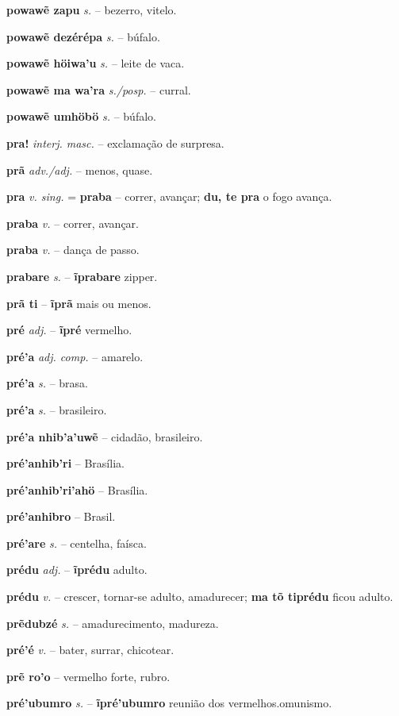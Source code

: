 \textbf{powawẽ zapu} \textit{s.} -- bezerro, vitelo.

\textbf{powawẽ dezérépa} \textit{s.} -- búfalo.

\textbf{powawẽ höiwa'u} \textit{s.} -- leite de vaca.

\textbf{powawẽ ma wa'ra} \textit{s./posp.} -- curral.

\textbf{powawẽ umhöbö} \textit{s.} -- búfalo.

\textbf{pra!} \textit{interj. masc.} -- exclamação de surpresa.

\textbf{prã} \textit{adv./adj.} -- menos, quase.

\textbf{pra} \textit{v. sing.} = \textbf{praba} -- correr, avançar; \textbf{du, te pra} o fogo avança.

\textbf{praba} \textit{v.} -- correr, avançar.

\textbf{praba} \textit{v.} -- dança de passo.

\textbf{prabare} \textit{s.} -- \textbf{ĩprabare} zipper.

\textbf{prã ti} -- \textbf{ĩprã} mais ou menos.

\textbf{pré} \textit{adj.} -- \textbf{ĩpré} vermelho.

\textbf{pré'a} \textit{adj. comp.} -- amarelo.

\textbf{pré'a} \textit{s.} -- brasa.

\textbf{pré'a} \textit{s.} -- brasileiro.

\textbf{pré'a nhib'a'uwẽ} \textit{} -- cidadão, brasileiro.

\textbf{pré'anhib'ri} \textit{} -- Brasília.

\textbf{pré'anhib'ri'ahö} \textit{} -- Brasília.

\textbf{pré'anhibro} \textit{} -- Brasil.

\textbf{pré'are} \textit{s.} -- centelha, faísca.

\textbf{prédu} \textit{adj.} -- \textbf{ĩprédu} adulto.

\textbf{prédu} \textit{v.} -- crescer, tornar-se adulto, amadurecer; \textbf{ma tõ tiprédu} ficou adulto.

\textbf{prẽdubzé} \textit{s.} -- amadurecimento, madureza.

\textbf{pré'é} \textit{v.} -- bater, surrar, chicotear.

\textbf{prẽ ro'o} -- vermelho forte, rubro.

\textbf{pré'ubumro} \textit{s.} -- \textbf{ĩpré'ubumro} reunião dos vermelhos.omunismo.

